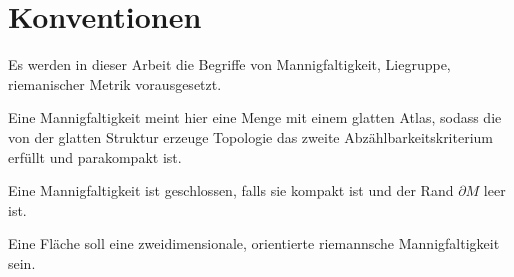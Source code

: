 


\section{Konventionen}
Es werden in dieser Arbeit die Begriffe von Mannigfaltigkeit, Liegruppe,
riemanischer Metrik vorausgesetzt.

Eine Mannigfaltigkeit meint hier eine Menge mit einem glatten Atlas, sodass die von der glatten Struktur erzeuge Topologie das zweite Abzählbarkeitskriterium erfüllt und parakompakt ist.

Eine Mannigfaltigkeit ist geschlossen, falls sie kompakt ist und
der Rand $ \partial M  $ leer ist.

Eine Fläche soll eine zweidimensionale, orientierte riemannsche Mannigfaltigkeit sein.

%


%
%
%
%
%
%
%


